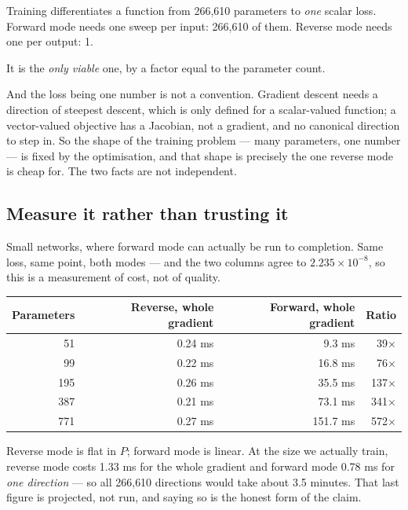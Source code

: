 \documentclass[11pt,a4paper]{article}
\begin{document}
Training differentiates a function from 266{,}610 parameters to \emph{one}
scalar loss. Forward mode needs one sweep per input: 266{,}610 of them. Reverse
mode needs one per output: 1.

\begin{keybox}[title={Reverse mode is not a good choice}]
It is the \emph{only viable} one, by a factor equal to the parameter count.
\end{keybox}

And the loss being one number is not a convention. Gradient descent needs a
direction of steepest descent, which is only defined for a scalar-valued
function; a vector-valued objective has a Jacobian, not a gradient, and no
canonical direction to step in. So the shape of the training problem --- many
parameters, one number --- is fixed by the optimisation, and that shape is
precisely the one reverse mode is cheap for. The two facts are not independent.

\subsection{Measure it rather than trusting it}

Small networks, where forward mode can actually be run to completion. Same
loss, same point, both modes --- and the two columns agree to
$2.235\times10^{-8}$, so this is a measurement of cost, not of quality.

\begin{center}
\small
\begin{tabular}{rrrr}
\toprule
\textbf{Parameters} & \textbf{Reverse, whole gradient} &
\textbf{Forward, whole gradient} & \textbf{Ratio} \\
\midrule
 51 & 0.24 ms &   9.3 ms &  39$\times$ \\
 99 & 0.22 ms &  16.8 ms &  76$\times$ \\
195 & 0.26 ms &  35.5 ms & 137$\times$ \\
387 & 0.21 ms &  73.1 ms & 341$\times$ \\
771 & 0.27 ms & 151.7 ms & 572$\times$ \\
\bottomrule
\end{tabular}
\end{center}

Reverse mode is flat in $P$; forward mode is linear. At the size we actually
train, reverse mode costs 1.33 ms for the whole gradient and forward mode 0.78
ms for \emph{one direction} --- so all 266{,}610 directions would take about
3.5 minutes. That last figure is projected, not run, and saying so is the
honest form of the claim.
\end{document}
